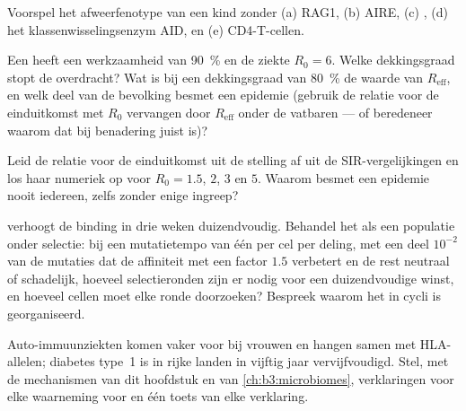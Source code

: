 \begin{exercise}[$\star\star$]\label{exo:b3:adaptive-immunity:8}
Voorspel het afweerfenotype van een kind zonder (a) RAG1, (b) AIRE,
(c) , (d) het klassenwisselingsenzym AID, en (e) CD4-T-cellen.
\end{exercise}

\begin{exercise}[$\star\star$]\label{exo:b3:adaptive-immunity:9}
Een  heeft een werkzaamheid van \qty{90}{\%} en de ziekte
$R_{0} = 6$. Welke dekkingsgraad stopt de overdracht? Wat is bij een
dekkingsgraad van \qty{80}{\%} de waarde van $R_{\text{eff}}$, en welk
deel van de bevolking besmet een epidemie (gebruik de relatie voor de
einduitkomst met $R_{0}$ vervangen door $R_{\text{eff}}$ onder de
vatbaren --- of beredeneer waarom dat bij benadering juist is)?
\end{exercise}

\begin{exercise}[$\star\star\star$]\label{exo:b3:adaptive-immunity:10}
Leid de relatie voor de einduitkomst uit de stelling af uit de
SIR-vergelijkingen en los haar numeriek op voor $R_{0} = 1.5$, $2$, $3$
en $5$. Waarom besmet een epidemie nooit iedereen, zelfs zonder enige
ingreep?
\end{exercise}

\begin{exercise}[$\star\star\star$]\label{exo:b3:adaptive-immunity:11}
 verhoogt de binding in drie weken duizendvoudig.
Behandel het  als een populatie onder selectie: bij een
mutatietempo van één per cel per deling, met een deel $10^{-2}$ van de
mutaties dat de affiniteit met een factor $1.5$ verbetert en de rest
neutraal of schadelijk, hoeveel selectieronden zijn er nodig voor een
duizendvoudige winst, en hoeveel cellen moet elke ronde doorzoeken?
Bespreek waarom het  in cycli is georganiseerd.
\end{exercise}

\begin{exercise}[$\star\star\star$]\label{exo:b3:adaptive-immunity:12}
Auto-immuunziekten komen vaker voor bij vrouwen en hangen samen met
HLA-allelen; diabetes type~1 is in rijke landen in vijftig jaar
vervijfvoudigd. Stel, met de mechanismen van dit hoofdstuk en van
\cref{ch:b3:microbiomes}, verklaringen voor elke waarneming voor en één
toets van elke verklaring.
\end{exercise}

